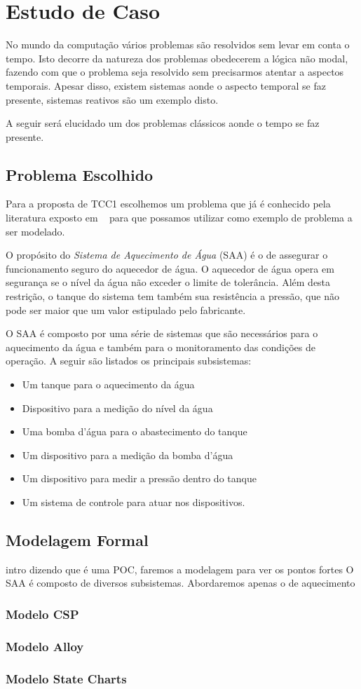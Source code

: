 \section{Estudo de Caso}
No mundo da computação vários problemas são resolvidos sem levar em conta o tempo.
Isto decorre da natureza dos problemas obedecerem a lógica não modal, fazendo com que o
problema seja resolvido sem precisarmos atentar a aspectos temporais. Apesar disso,
existem sistemas aonde o aspecto temporal se faz presente, sistemas reativos são um exemplo disto.

A seguir será elucidado um dos problemas clássicos aonde o tempo se faz presente.
\subsection{Problema Escolhido}
Para a proposta de TCC1 escolhemos um problema que já é conhecido pela literatura exposto
em ~\cite{opac-b1092561} para que possamos utilizar como exemplo de problema a ser modelado.

O propósito do \textit{Sistema de Aquecimento de Água} (SAA) é o de assegurar o funcionamento
seguro do aquecedor de água. O aquecedor de água opera em segurança se o nível da água
não exceder o limite de tolerância. Além desta restrição, o tanque do sistema tem também
sua resistência a pressão, que não pode ser maior que um valor estipulado pelo fabricante.

O SAA é composto por uma série de sistemas que são necessários para o aquecimento da água e também
para o monitoramento das condições de operação. A seguir são listados os principais subsistemas:
\begin{itemize}
\item Um tanque para o aquecimento da água
\item Dispositivo para a medição do nível da água
\item Uma bomba d'água para o abastecimento do tanque
\item Um dispositivo para a medição da bomba d'água
\item Um dispositivo para medir a pressão dentro do tanque
\item Um sistema de controle para atuar nos dispositivos.
\end{itemize}

\subsection{Modelagem Formal}
intro dizendo que é uma POC, faremos a modelagem para ver os pontos fortes
O SAA é composto de diversos subsistemas. Abordaremos apenas o de aquecimento
\subsubsection{Modelo CSP}
\subsubsection{Modelo Alloy}
\subsubsection{Modelo State Charts}
